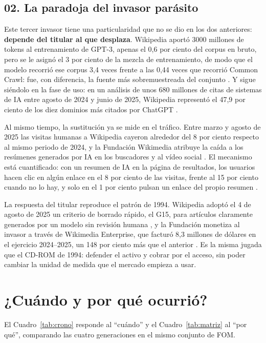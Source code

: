 \documentclass[11pt,letterpaper]{article}
\begin{document}
\subsection*{02. La paradoja del invasor parásito}

Este tercer invasor tiene una particularidad que no se dio en los dos anteriores:
\textbf{depende del titular al que desplaza}. Wikipedia aportó \num{3000}
millones de tokens al entrenamiento de GPT-3, apenas el 0,6 por ciento del corpus
en bruto, pero se le asignó el 3 por ciento de la mezcla de entrenamiento, de
modo que el modelo recorrió ese corpus 3,4 veces frente a las 0,44 veces que
recorrió Common Crawl: fue, con diferencia, la fuente más sobremuestreada del
conjunto \parencite{brown2020}. Y sigue siéndolo en la fase de uso: en un
análisis de unos 680 millones de citas de sistemas de IA entre agosto de 2024 y
junio de 2025, Wikipedia representó el 47,9 por ciento de los diez dominios más
citados por ChatGPT \parencite{profound2025}.

Al mismo tiempo, la sustitución ya se mide en el tráfico. Entre marzo y agosto de
2025 las visitas humanas a Wikipedia cayeron alrededor del 8 por ciento respecto
al mismo periodo de 2024, y la Fundación Wikimedia atribuye la caída a los
resúmenes generados por IA en los buscadores y al vídeo social
\parencite{miller2025}. El mecanismo está cuantificado: con un resumen de IA en
la página de resultados, los usuarios hacen clic en algún enlace en el 8 por
ciento de las visitas, frente al 15 por ciento cuando no lo hay, y solo en el 1
por ciento pulsan un enlace del propio resumen \parencite{pew2025}.

La respuesta del titular reproduce el patrón de 1994. Wikipedia adoptó el 4 de
agosto de 2025 un criterio de borrado rápido, el G15, para artículos claramente
generados por un modelo sin revisión humana \parencite{wikig15}, y la Fundación
monetiza al invasor a través de Wikimedia Enterprise, que facturó 8,3 millones de
dólares en el ejercicio 2024--2025, un 148 por ciento más que el anterior
\parencite{wmf2025}. Es la misma jugada que el CD-ROM de 1994: defender el activo
y cobrar por el acceso, sin poder cambiar la unidad de medida que el mercado
empieza a usar.

\section{¿Cuándo y por qué ocurrió?}

El Cuadro~\ref{tab:crono} responde al \enquote{cuándo} y el
Cuadro~\ref{tab:matriz} al \enquote{por qué}, comparando las cuatro
generaciones en el mismo conjunto de FOM.
\end{document}
